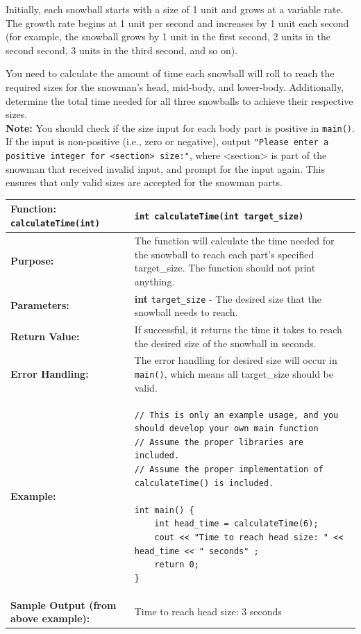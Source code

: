 Initially, each snowball starts with a size of 1 unit and grows at a variable rate. The growth rate begins at 1 unit per second and increases by 1 unit each second (for example, the snowball grows by 1 unit in the first second, 2 units in the second second, 3 units in the third second, and so on).

You need to calculate the amount of time each snowball will roll to reach the required sizes for the snowman's head, mid-body, and lower-body. Additionally, determine the total time needed for all three snowballs to achieve their respective sizes. \\

\textbf{Note:} You should check if the size input for each body part is positive in \texttt{main()}. If the input is non-positive (i.e., zero or negative), output \texttt{"Please enter a positive integer for <section> size:"}, where <section> is part of the snowman that received invalid input, and prompt for the input again. This ensures that only valid sizes are accepted for the snowman parts.

\begin{longtable}{|p{1.7in}|p{4.3in}|}
\hline
\textbf{Function:}  \texttt{calculateTime(int)} 
& \texttt{int calculateTime(int target_size)} \\ \hline

\textbf{Purpose:} & The function will calculate the time needed for the snowball to reach each part's specified target\_size. The function should not print anything. \\ \hline

\textbf{Parameters:} & 
\textbf{int} \texttt{target\_size} - The desired size that the snowball needs to reach. \\ \hline

\textbf{Return Value:} & 
If successful, it returns the time it takes to reach the desired size of the snowball in seconds. \\ \hline

\textbf{Error Handling:} & The error handling for desired size will occur in \texttt{main()}, which means all target\_size should be valid. \\ \hline

\textbf{Example:} & 
\begin{verbatim}
// This is only an example usage, and you should develop your own main function
// Assume the proper libraries are included.
// Assume the proper implementation of calculateTime() is included.

int main() {
    int head_time = calculateTime(6);
    cout << "Time to reach head size: " << head_time << " seconds" ;
    return 0;
}
\end{verbatim}
\\ \hline

\textbf{Sample Output (from above example):} & Time to reach head size: 3 seconds\\ \hline

\end{longtable}

